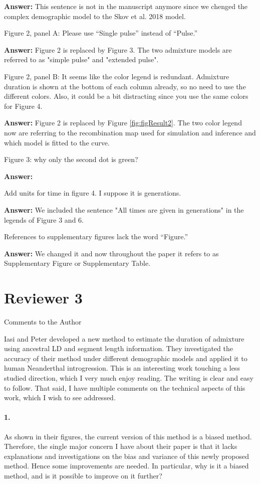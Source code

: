\documentclass[11pt]{article}
\let\oldparagraph\paragraph
\renewcommand{\paragraph}[1]{\oldparagraph{#1}\mbox{}}
\begin{document}
\textbf{Answer:} This sentence is not in the manuscript anymore since we chenged the complex demographic model to the Skov et al. 2018 model.

Figure 2, panel A: Please use “Single pulse” instead of “Pulse.”

\textbf{Answer:} Figure 2 is replaced by Figure 3. The two admixture models are referred  to as "simple pulse" and "extended pulse".


Figure 2, panel B: It seems like the color legend is redundant. Admixture duration is shown at the bottom of each column already, so no need to use the different colors. Also, it could be a bit distracting since you use the same colors for Figure 4. 

\textbf{Answer:} Figure 2 is replaced by Figure \ref{fig:figResult2}. The two color legend now are referring to the recombination map used for simulation and inference and which model is fitted to the curve.

Figure 3: why only the second dot is green?

\textbf{Answer:} 

Add units for time in figure 4. I suppose it is generations.

\textbf{Answer:} We included the sentence "All times are given in generations" in the legends of Figure 3 and 6.

References to supplementary figures lack the word “Figure.” 

\textbf{Answer:} We changed it and now throughout the paper it refers to as Supplementary Figure or Supplementary Table.

\section{Reviewer 3}\label{Reviewer 3}

Comments to the Author

Iasi and Peter developed a new method to estimate the duration of admixture using ancestral LD and segment length information. They investigated the accuracy of their method under different demographic models and applied it to human Neanderthal introgression. This is an interesting work touching a less studied direction, which I very much enjoy reading. The writing is clear and easy to follow. That said, I have multiple comments on the technical aspects of this work, which I wish to see addressed. 

\paragraph{1.}
As shown in their figures, the current version of this method is a biased method. Therefore, the single major concern I have about their paper is that it lacks explanations and investigations on the bias and variance of this newly proposed method. Hence some improvements are needed. In particular, why is it a biased method, and is it possible to improve on it further?
\end{document}
